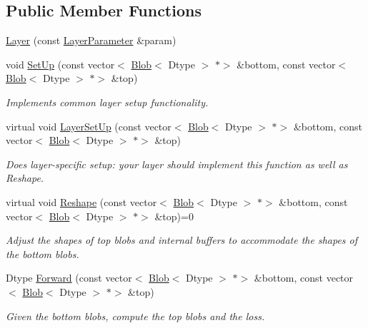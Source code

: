 \subsection*{Public Member Functions}
\begin{DoxyCompactItemize}
\item 
\mbox{\hyperlink{classcaffe_1_1_layer_a7b4e4ccea08c7b8b15acc6829d5735f6}{Layer}} (const \mbox{\hyperlink{classcaffe_1_1_layer_parameter}{Layer\+Parameter}} \&param)
\item 
void \mbox{\hyperlink{classcaffe_1_1_layer_a18d6bfdb535ab8e96a971dec4ae39a84}{Set\+Up}} (const vector$<$ \mbox{\hyperlink{classcaffe_1_1_blob}{Blob}}$<$ Dtype $>$ $\ast$$>$ \&bottom, const vector$<$ \mbox{\hyperlink{classcaffe_1_1_blob}{Blob}}$<$ Dtype $>$ $\ast$$>$ \&top)
\begin{DoxyCompactList}\small\item\em Implements common layer setup functionality. \end{DoxyCompactList}\item 
virtual void \mbox{\hyperlink{classcaffe_1_1_layer_a481323a3e0972c682787f2137468c29f}{Layer\+Set\+Up}} (const vector$<$ \mbox{\hyperlink{classcaffe_1_1_blob}{Blob}}$<$ Dtype $>$ $\ast$$>$ \&bottom, const vector$<$ \mbox{\hyperlink{classcaffe_1_1_blob}{Blob}}$<$ Dtype $>$ $\ast$$>$ \&top)
\begin{DoxyCompactList}\small\item\em Does layer-\/specific setup\+: your layer should implement this function as well as Reshape. \end{DoxyCompactList}\item 
virtual void \mbox{\hyperlink{classcaffe_1_1_layer_a7fe981e8af8d93d587acf2a952be563d}{Reshape}} (const vector$<$ \mbox{\hyperlink{classcaffe_1_1_blob}{Blob}}$<$ Dtype $>$ $\ast$$>$ \&bottom, const vector$<$ \mbox{\hyperlink{classcaffe_1_1_blob}{Blob}}$<$ Dtype $>$ $\ast$$>$ \&top)=0
\begin{DoxyCompactList}\small\item\em Adjust the shapes of top blobs and internal buffers to accommodate the shapes of the bottom blobs. \end{DoxyCompactList}\item 
Dtype \mbox{\hyperlink{classcaffe_1_1_layer_ab57d272dabe8c709d2a785eebe72ca57}{Forward}} (const vector$<$ \mbox{\hyperlink{classcaffe_1_1_blob}{Blob}}$<$ Dtype $>$ $\ast$$>$ \&bottom, const vector$<$ \mbox{\hyperlink{classcaffe_1_1_blob}{Blob}}$<$ Dtype $>$ $\ast$$>$ \&top)
\begin{DoxyCompactList}\small\item\em Given the bottom blobs, compute the top blobs and the loss. \end{DoxyCompactList}\item 

\end{DoxyCompactItemize}
